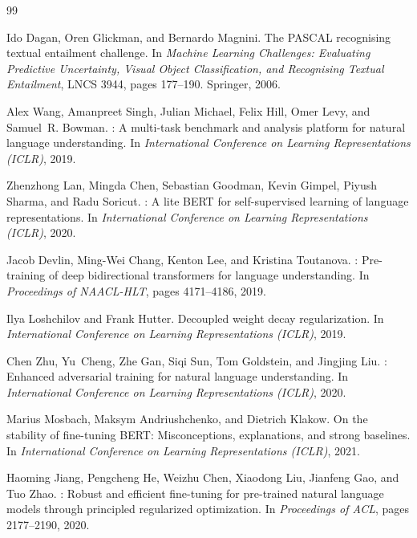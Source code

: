 \documentclass[11pt]{article}
\begin{document}
\begin{thebibliography}{99}
\small

Ido Dagan, Oren Glickman, and Bernardo Magnini.
\newblock The {PASCAL} recognising textual entailment challenge.
\newblock In \emph{Machine Learning Challenges: Evaluating Predictive Uncertainty, Visual Object Classification,
  and Recognising Textual Entailment}, LNCS 3944, pages 177--190. Springer, 2006.

Alex Wang, Amanpreet Singh, Julian Michael, Felix Hill, Omer Levy, and Samuel~R. Bowman.
: A multi-task benchmark and analysis platform for natural language understanding.
\newblock In \emph{International Conference on Learning Representations (ICLR)}, 2019.

Zhenzhong Lan, Mingda Chen, Sebastian Goodman, Kevin Gimpel, Piyush Sharma, and Radu Soricut.
: A lite {BERT} for self-supervised learning of language representations.
\newblock In \emph{International Conference on Learning Representations (ICLR)}, 2020.

Jacob Devlin, Ming-Wei Chang, Kenton Lee, and Kristina Toutanova.
: Pre-training of deep bidirectional transformers for language understanding.
\newblock In \emph{Proceedings of NAACL-HLT}, pages 4171--4186, 2019.

Ilya Loshchilov and Frank Hutter.
\newblock Decoupled weight decay regularization.
\newblock In \emph{International Conference on Learning Representations (ICLR)}, 2019.

Chen Zhu, Yu~Cheng, Zhe Gan, Siqi Sun, Tom Goldstein, and Jingjing Liu.
: Enhanced adversarial training for natural language understanding.
\newblock In \emph{International Conference on Learning Representations (ICLR)}, 2020.

Marius Mosbach, Maksym Andriushchenko, and Dietrich Klakow.
\newblock On the stability of fine-tuning {BERT}: Misconceptions, explanations, and strong baselines.
\newblock In \emph{International Conference on Learning Representations (ICLR)}, 2021.

Haoming Jiang, Pengcheng He, Weizhu Chen, Xiaodong Liu, Jianfeng Gao, and Tuo Zhao.
: Robust and efficient fine-tuning for pre-trained natural language models through principled
  regularized optimization.
\newblock In \emph{Proceedings of ACL}, pages 2177--2190, 2020.


\end{thebibliography}
\end{document}
